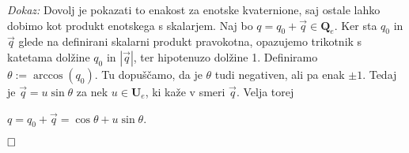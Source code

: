 \documentclass[a4paper,12pt]{article}
\def\R{\mathbb{R}} %
\def\H{\mathbb{H}} %
\def\Qe{\textbf{Q}_{e}} %
\def\Ue{\textbf{U}_{e}} %
\def\1{\textbf{\emph{1}}}
\def\qed{$\hfill\Box$}   %
\begin{document}
\break
\noindent
{\em Dokaz: \/}Dovolj je pokazati to enakost za enotske kvaternione, saj ostale lahko dobimo kot produkt enotskega s skalarjem.
Naj bo $q = q_{0} + \vec{q} \in \Qe$. Ker sta $q_{0}$ in $\vec{q}$ glede na definirani skalarni produkt pravokotna, opazujemo trikotnik s katetama dolžine $q_{0}$ in $|\vec{q}|$, ter hipotenuzo dolžine 1.
Definiramo $\theta := \arccos(q_{0})$. Tu dopuščamo, da je $\theta$ tudi negativen, ali pa enak $\pm 1$. Tedaj je $\vec{q} = u\sin\theta$ za nek $u \in \Ue$, ki kaže v smeri $\vec{q}$.
Velja torej
\begin{center}
   $q = q_{0} + \vec{q} = \cos\theta + u\sin\theta$.
\end{center}
\qed



\end{document}
